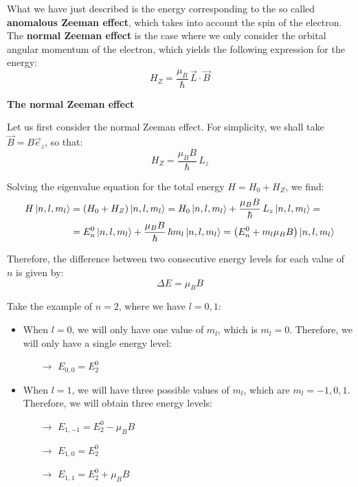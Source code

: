 What we have just described is the energy corresponding to the so called \textbf{anomalous Zeeman effect}, which takes into account the spin of the electron. The \textbf{normal Zeeman effect} is the case where we only consider the orbital angular momentum of the electron, which yields the following expression for the energy:
\begin{equation}
    H_Z = \frac{\mu_B}{\hbar}\,\vec{L}\cdot \vec{B}
\end{equation}

\textbf{The normal Zeeman effect}

Let us first consider the normal Zeeman effect. For simplicity, we shall take $\vec{B} = B\vec{e}_z$, so that:
\begin{equation}
    H_Z = \frac{\mu_B B}{\hbar}\,L_z
\end{equation}

Solving the eigenvalue equation for the total energy $H = H_0+H_Z$, we find:
\begin{equation}
    \begin{split}
        H\ket{n,l,m_l} &= (H_0+H_Z)\ket{n,l,m_l} = H_0\ket{n,l,m_l} + \frac{\mu_B B}{\hbar}\,L_z\ket{n,l,m_l} = \\
        &= E_n^0\ket{n,l,m_l} + \frac{\mu_B B}{\hbar}\,\hbar m_l\ket{n,l,m_l} = \left( E_n^0 + m_l\mu_B B \right)\ket{n,l,m_l}
    \end{split}
\end{equation}

Therefore, the difference between two consecutive energy levels for each value of $n$ is given by:
\begin{equation}
    \Delta E = \mu_B B
\end{equation}

Take the example of $n=2$, where we have $l = 0, 1$:
\begin{itemize}
    \item When $l=0$, we will only have one value of $m_l$, which is $m_l = 0$. Therefore, we will only have a single energy level:
    \begin{itemize}
        \item[$\to$] $E_{0,0} = E_2^0$
    \end{itemize}
    \item When $l=1$, we will have three possible values of $m_l$, which are $m_l = -1, 0, 1$. Therefore, we will obtain three energy levels:
    \begin{itemize}
        \item[$\to$] $E_{1,-1} = E_2^0 - \mu_B B$
        \item[$\to$] $E_{1,0} = E_2^0$
        \item[$\to$] $E_{1,1} = E_2^0 + \mu_B B$
    \end{itemize}
\end{itemize}

